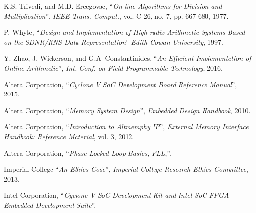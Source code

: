 \begin{thebibliography}{1}
  K.S. Trivedi, and M.D. Ercegovac,
  ``\textit{On-line Algorithms for Division and Multiplication}'',
  \textit{IEEE Trans. Comput.}, vol. C-26, no. 7, pp. 667-680,
  1977.

  P. Whyte,
  ``\textit{Design and Implementation of High-radix Arithmetic Systems Based
  on the SDNR/RNS Data Representation}''
  \textit{Edith Cowan University},
  1997.

  Y. Zhao, J. Wickerson, and G.A. Constantinides,
  ``\textit{An Efficient Implementation of Online Arithmetic}'',
  \textit{Int. Conf. on Field-Programmable Technology},
  2016.


  Altera Corporation,
  ``\textit{Cyclone V SoC Development Board Reference Manual}'',
  2015.

  Altera Corporation,
  ``\textit{Memory System Design}'',
  \textit{Embedded Design Handbook},
  2010.

  Altera Corporation,
  ``\textit{Introduction to Altmemphy IP}'',
  \textit{External Memory Interface Handbook: Reference Material}, vol. 3,
  2012.

  Altera Corporation,
  ``\textit{Phase-Locked Loop Basics, PLL},''.

  Imperial College
  ``\textit{An Ethics Code}'',
  \textit{Imperial College Research Ethics Committee},
  2013.

  Intel Corporation,
  ``\textit{Cyclone V SoC Development Kit and Intel SoC FPGA Embedded
  Development Suite}''.


\end{thebibliography}

